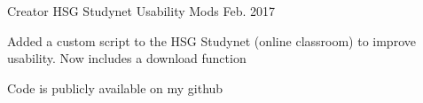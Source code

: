 

\begin{cventries}

  \cventry
    {Creator} %
    {HSG Studynet Usability Mods} %
    {} %
    {Feb. 2017} %
    {} %
    {
      \begin{cvitems} %
        \item {Added a custom script to the HSG Studynet (online classroom) to improve usability. Now includes a download function}
        \item {Code is publicly available on my github}
      \end{cvitems}
    }


\end{cventries}
